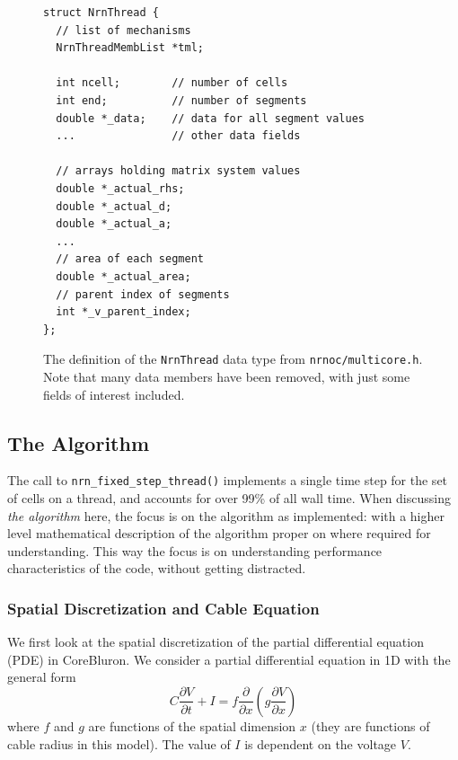 \documentclass[11pt,a4paper]{article}
\newcommand{\lst}[1]{\lstinline!#1!}
\newcommand{\file}[1]{\lstinline[basicstyle=\normalsize,]!#1!}
\newcommand{\pder}[2]{\frac{\partial{#1}}{\partial{#2}}}
\newcommand{\neuron}{CoreBluron}
\begin{document}
\begin{figure}
\begin{shaded}
\begin{lstlisting}
struct NrnThread {
  // list of mechanisms
  NrnThreadMembList *tml;

  int ncell;        // number of cells
  int end;          // number of segments
  double *_data;    // data for all segment values
  ...               // other data fields

  // arrays holding matrix system values
  double *_actual_rhs;
  double *_actual_d;
  double *_actual_a;
  ...
  // area of each segment
  double *_actual_area;
  // parent index of segments
  int *_v_parent_index;
};
\end{lstlisting}
\end{shaded}
\label{lst:NrnThread}
\caption{The definition of the \lst{NrnThread} data type from \file{nrnoc/multicore.h}. Note that many data members have been removed, with just some fields of interest included.}
\end{figure}

\subsection{The Algorithm}
The call to \lst{nrn_fixed_step_thread()} implements a single time step for the set of cells on a thread, and accounts for over 99\% of all wall time. When discussing \emph{the algorithm} here, the focus is on the algorithm as implemented: with a higher level mathematical description of the algorithm proper on where required for understanding. This way the focus is on understanding performance characteristics of the code, without getting distracted.

\subsubsection{Spatial Discretization and Cable Equation}
We first look at the spatial discretization of the partial differential equation (PDE) in \neuron. We consider a partial differential equation in 1D with the general form
\begin{equation}
     C\pder{V}{t} + I = f \pder{}{x} \left( g\pder{V}{x} \right)
\end{equation}
where $f$ and $g$ are functions of the spatial dimension $x$ (they are functions of cable radius in this model). The value of $I$ is dependent on the voltage $V$.
\end{document}
